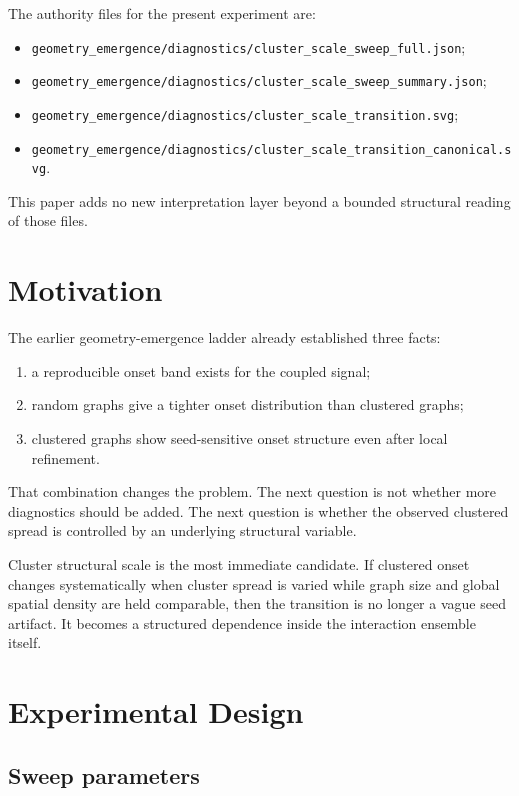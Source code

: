 \documentclass[11pt]{article}
\begin{document}
The authority files for the present experiment are:
\begin{itemize}
\item \texttt{geometry\_emergence/diagnostics/cluster\_scale\_sweep\_full.json};
\item \texttt{geometry\_emergence/diagnostics/cluster\_scale\_sweep\_summary.json};
\item \texttt{geometry\_emergence/diagnostics/cluster\_scale\_transition.svg};
\item \texttt{geometry\_emergence/diagnostics/cluster\_scale\_transition\_canonical.svg}.
\end{itemize}

This paper adds no new interpretation layer beyond a bounded structural reading of those files.

\section{Motivation}

The earlier geometry-emergence ladder already established three facts:
\begin{enumerate}
\item a reproducible onset band exists for the coupled signal;
\item random graphs give a tighter onset distribution than clustered graphs;
\item clustered graphs show seed-sensitive onset structure even after local refinement.
\end{enumerate}

That combination changes the problem. The next question is not whether more diagnostics should be added. The next question is whether the observed clustered spread is controlled by an underlying structural variable.

Cluster structural scale is the most immediate candidate. If clustered onset changes systematically when cluster spread is varied while graph size and global spatial density are held comparable, then the transition is no longer a vague seed artifact. It becomes a structured dependence inside the interaction ensemble itself.

\section{Experimental Design}

\subsection{Sweep parameters}
\end{document}
